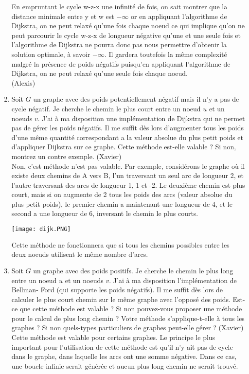 \documentclass[11pt]{article}
\begin{document}
\begin{enumerate}
En empruntant le cycle w-z-x une infinité de fois, on sait montrer que 
la distance minimale entre y et w est $ -\infty $ 
or en appliquant l'algorithme de Dijkstra, 
on ne peut relaxé qu'une fois chaque noeud ce qui implique qu'on ne peut parcourir
le cycle w-z-x de longueur négative qu'une et une seule fois et l'algorithme 
de Dijkstra ne pourra donc pas nous permettre d'obtenir la solution optimale,
 à savoir $ -\infty $. Il gardera toutefois la même complexité malgré la présence de poids négatifs puisqu'en appliquant 
 l'algorithme de Dijkstra, on ne peut relaxé qu'une seule fois chaque noeud.\\

(Alexis)\\

\item Soit $G$ un graphe avec des poids potentiellement négatif mais il n’y a pas de
cycle négatif. Je cherche le chemin le plus court entre un noeud $u$ et un noeuds $v$.
J’ai à ma disposition une implémentation de Dijkstra qui ne permet pas de gérer
les poids négatifs. Il me suffit dès lors d’augmenter tous les poids d’une même
quantité correspondant a la valeur absolue du plus petit poids et d’appliquer
Dijkstra sur ce graphe. Cette méthode est-elle valable ? Si non, montrez un contre
exemple. (Xavier)\\

Non, c'est méthode n'est pas valable. Par exemple, considérons le graphe où il existe deux chemins de A vers B, l'un traversant un seul arc de longueur 2, et l'autre traversant des arcs de longueur 1, 1 et -2. Le deuxième chemin est plus court, mais si on augmente de 2 tous les poids des arcs (valeur absolue du plus petit poids), le premier chemin a maintenant une longueur de 4, et le second a une longueur de 6, inversant le chemin le plus courts.
\begin{center}
\texttt{[image: dijk.PNG]} 
\end{center}
Cette méthode ne fonctionnera que si tous les chemins possibles entre les deux noeuds utilisent le même nombre d'arcs.\\

\item Soit $G$ un graphe avec des poids positifs. Je cherche le chemin le plus long entre
un noeud $u$ et un noeuds $v$. J’ai à ma disposition l’implémentation de Bellman-
Ford (qui supporte les poids négatifs). Il me suffit dès lors de calculer le plus
court chemin sur le même graphe avec l’opposé des poids. Est-ce que cette méthode
est valable ? Si non pouvez-vous proposer une méthode pour le calcul de
plus long chemin ? Votre méthode s’applique-t-elle à tous les graphes ? Si non
quels-types particuliers de graphes peut-elle gérer ? (Xavier)\\

Cette méthode est valable pour certains graphes. Le principe le plus important pour l'utilisation de cette méthode est qu'il n'y ait pas de cycle dans le graphe, dans laquelle les arcs ont une somme négative. Dans ce cas, une boucle infinie serait générée et aucun plus long chemin ne serait trouvé.

\end{enumerate}
\end{document}

